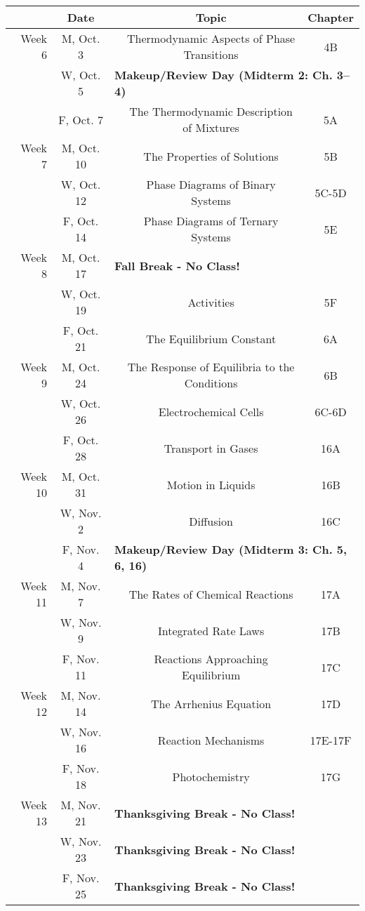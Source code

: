 \documentclass[12pt, letterpaper]{article}
\begin{document}
\noindent
\begin{tabular}{rcccc}
& Date && Topic & Chapter\\
\midrule
Week 6 & M, Oct. 3&& Thermodynamic Aspects of Phase Transitions & 4B\\
& W, Oct. 5& \multicolumn{3}{l}{\textbf{Makeup/Review Day (Midterm 2: Ch. 3--4)}}\\
& F, Oct. 7&& The Thermodynamic Description of Mixtures & 5A\\
\midrule
Week 7 & M, Oct. 10&& The Properties of Solutions & 5B\\
& W, Oct. 12&& Phase Diagrams of Binary Systems & 5C-5D\\
& F, Oct. 14&& Phase Diagrams of Ternary Systems & 5E\\
\midrule
Week 8 & M, Oct. 17& \multicolumn{3}{l}{\textbf{Fall Break - No Class!}}\\
& W, Oct. 19&& Activities & 5F\\
& F, Oct. 21&& The Equilibrium Constant & 6A\\
\midrule
Week 9 & M, Oct. 24&& The Response of Equilibria to the Conditions & 6B\\
& W, Oct. 26&& Electrochemical Cells & 6C-6D\\
& F, Oct. 28&& Transport in Gases & 16A\\
\midrule
Week 10 & M, Oct. 31&& Motion in Liquids & 16B\\
& W, Nov. 2&& Diffusion & 16C\\
& F, Nov. 4& \multicolumn{3}{l}{\textbf{Makeup/Review Day (Midterm 3: Ch. 5, 6, 16)}}\\
\midrule
Week 11 & M, Nov. 7&& The Rates of Chemical Reactions & 17A\\
& W, Nov. 9&& Integrated Rate Laws & 17B\\
& F, Nov. 11&& Reactions Approaching Equilibrium & 17C\\
\midrule
Week 12 & M, Nov. 14&& The Arrhenius Equation & 17D\\
& W, Nov. 16&& Reaction Mechanisms & 17E-17F\\
& F, Nov. 18&& Photochemistry & 17G\\
\midrule
Week 13 & M, Nov. 21& \multicolumn{3}{l}{\textbf{Thanksgiving Break - No Class!}}\\
& W, Nov. 23& \multicolumn{3}{l}{\textbf{Thanksgiving Break - No Class!}}\\
& F, Nov. 25& \multicolumn{3}{l}{\textbf{Thanksgiving Break - No Class!}}\\
\end{tabular}
\end{document}
